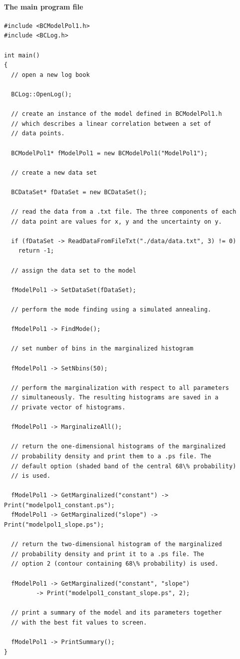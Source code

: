 \documentclass[11pt, a4paper]{article}
\begin{document}
\paragraph{The main program file} 
% 
\begin{small} 
\begin{verbatim}
#include <BCModelPol1.h>
#include <BCLog.h> 

int main()
{
  // open a new log book 

  BCLog::OpenLog(); 

  // create an instance of the model defined in BCModelPol1.h 
  // which describes a linear correlation between a set of 
  // data points. 

  BCModelPol1* fModelPol1 = new BCModelPol1("ModelPol1"); 

  // create a new data set 

  BCDataSet* fDataSet = new BCDataSet(); 

  // read the data from a .txt file. The three components of each 
  // data point are values for x, y and the uncertainty on y. 

  if (fDataSet -> ReadDataFromFileTxt("./data/data.txt", 3) != 0)
    return -1; 

  // assign the data set to the model 

  fModelPol1 -> SetDataSet(fDataSet); 

  // perform the mode finding using a simulated annealing. 

  fModelPol1 -> FindMode(); 

  // set number of bins in the marginalized histogram 

  fModelPol1 -> SetNbins(50);

  // perform the marginalization with respect to all parameters 
  // simultaneously. The resulting histograms are saved in a 
  // private vector of histograms. 

  fModelPol1 -> MarginalizeAll();

  // return the one-dimensional histograms of the marginalized 
  // probability density and print them to a .ps file. The 
  // default option (shaded band of the central 68\% probability) 
  // is used. 

  fModelPol1 -> GetMarginalized("constant") -> Print("modelpol1_constant.ps");
  fModelPol1 -> GetMarginalized("slope") -> Print("modelpol1_slope.ps");

  // return the two-dimensional histogram of the marginalized 
  // probability density and print it to a .ps file. The 
  // option 2 (contour containing 68\% probability) is used. 

  fModelPol1 -> GetMarginalized("constant", "slope") 
	     -> Print("modelpol1_constant_slope.ps", 2);

  // print a summary of the model and its parameters together 
  // with the best fit values to screen. 

  fModelPol1 -> PrintSummary(); 
} 
\end{verbatim} 
\end{small} 
\end{document}
